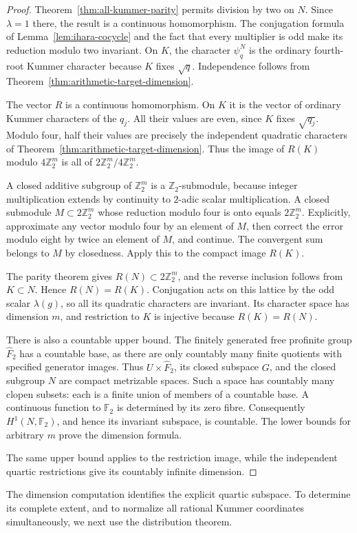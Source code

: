 \begin{proof}
Theorem~\ref{thm:all-kummer-parity} permits division by two on $N$.
Since $\lambda=1$ there, the result is a continuous homomorphism.
The conjugation formula of Lemma~\ref{lem:ihara-cocycle} and the fact
that every multiplier is odd make its reduction modulo two invariant.
On $K$, the character $\psi_q^N$ is the ordinary fourth-root Kummer
character because $K$ fixes $\sqrt q$. Independence follows from
Theorem~\ref{thm:arithmetic-target-dimension}.

The vector $R$ is a continuous homomorphism. On $K$ it is the vector of ordinary Kummer
characters of the $q_j$. All their values are even, since $K$ fixes
$\sqrt{q_j}$. Modulo four, half their values are precisely the
independent quadratic characters of
Theorem~\ref{thm:arithmetic-target-dimension}. Thus the image of $R(K)$
modulo $4\mathbb Z_2^m$ is all of
$2\mathbb Z_2^m/4\mathbb Z_2^m$.

A closed additive subgroup of $\mathbb Z_2^m$ is a
$\mathbb Z_2$-submodule, because integer multiplication extends by
continuity to $2$-adic scalar multiplication. A closed submodule
$M\subset2\mathbb Z_2^m$ whose reduction modulo four is onto equals
$2\mathbb Z_2^m$. Explicitly, approximate any vector modulo four by
an element of $M$, then correct the error modulo eight by twice an
element of $M$, and continue. The convergent sum belongs to $M$ by
closedness. Apply this to the compact image $R(K)$.

The parity theorem gives $R(N)\subset2\mathbb Z_2^m$, and the reverse
inclusion follows from $K\subset N$. Hence $R(N)=R(K)$.
Conjugation acts on this lattice by the odd scalar $\lambda(g)$, so
all its quadratic characters are invariant. Its character space has
dimension $m$, and restriction to $K$ is injective because $R(K)=R(N)$.

There is also a countable upper bound. The finitely generated free
profinite group $\widehat F_2$ has a countable base, as there are only
countably many finite quotients with specified generator images.
Thus $U\times\widehat F_2$, its closed subspace $G$, and the closed
subgroup $N$ are compact metrizable spaces. Such a space has countably
many clopen subsets: each is a finite union of members of a countable
base. A continuous function to $\mathbb F_2$ is determined by its
zero fibre. Consequently $H^1(N,\mathbb F_2)$, and hence its invariant
subspace, is countable. The lower bounds for arbitrary $m$ prove the
dimension formula.

The same upper bound applies to the restriction image, while the
independent quartic restrictions give its countably infinite dimension.
\end{proof}

The dimension computation identifies the explicit quartic subspace. To determine its complete extent, and to normalize all rational Kummer coordinates simultaneously, we next use the distribution theorem.
